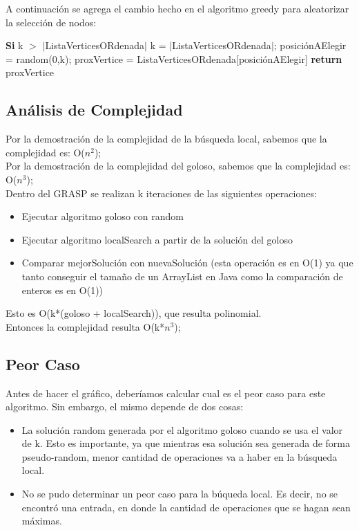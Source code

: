 A continuación se agrega el cambio hecho en el algoritmo greedy para aleatorizar la selección de nodos:\\
\begin{codebox}
\li     \textbf{Si} k $>$ $|$ListaVerticesORdenada$|$ \Do
\li 		k = $|$ListaVerticesORdenada$|$;
\End
\li 	posiciónAElegir = random(0,k);
\li	proxVertice = ListaVerticesORdenada[posiciónAElegir]
\li 	\textbf{return} proxVertice
\end{codebox}

\subsection{Análisis de Complejidad}
Por la demostración de la complejidad de la búsqueda local, sabemos que la complejidad es: O($n^2$);\\
Por la demostración de la complejidad del goloso, sabemos que la complejidad es: O($n^3$);\\
Dentro del GRASP se realizan k iteraciones de las siguientes operaciones:
\begin{itemize}
\item Ejecutar algoritmo goloso con random
\item Ejecutar algoritmo localSearch a partir de la solución del goloso
\item Comparar mejorSolución con nuevaSolución (esta operación es en O(1) ya que tanto conseguir el tamaño de un ArrayList en Java como la comparación de enteros es en O(1)) 
\end{itemize}
Esto es O(k*(goloso + localSearch)), que resulta polinomial.\\
Entonces la complejidad resulta O(k*$n^3$);

\subsection{Peor Caso}
Antes de hacer el gráfico, deberíamos calcular cual es el peor caso para este algoritmo. Sin embargo, el mismo depende de dos cosas:
\begin{itemize}
\item La solución random generada por el algoritmo goloso cuando se usa el valor de k. 	Esto es importante, ya que mientras esa solución sea generada de forma pseudo-random, menor cantidad
	de operaciones va a haber en la búsqueda local.
\item No se pudo determinar un peor caso para la búqueda local. Es decir, no se encontró una entrada, en donde la
	cantidad de operaciones que se hagan sean máximas.
\end{itemize}

